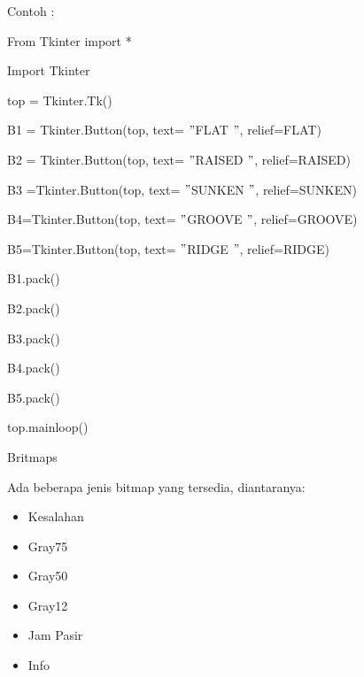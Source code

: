 \documentclass [12pt,a4paper,notitlepage,oneside,bahasa]{article}
\begin{document}
\begin{enumerate}
\begin{itemize}
\vspace{12pt}
Contoh : \par
{\fontsize{10pt}{10pt}\selectfont From Tkinter import *} \par
{\fontsize{10pt}{10pt}\selectfont Import Tkinter} \par
\vspace{10pt}
{\fontsize{10pt}{10pt}\selectfont top = Tkinter.Tk()} \par
{\fontsize{10pt}{10pt}\selectfont B1 = Tkinter.Button(top, text= $ " $FLAT $ " $, relief=FLAT)} \par
{\fontsize{10pt}{10pt}\selectfont B2 = Tkinter.Button(top, text= $ " $RAISED $ " $, relief=RAISED)} \par
{\fontsize{10pt}{10pt}\selectfont B3 =Tkinter.Button(top, text= $ " $SUNKEN $ " $, relief=SUNKEN)} \par
{\fontsize{10pt}{10pt}\selectfont B4=Tkinter.Button(top, text= $ " $GROOVE $ " $, relief=GROOVE)} \par
{\fontsize{10pt}{10pt}\selectfont B5=Tkinter.Button(top, text= $ " $RIDGE $ " $, relief=RIDGE)} \par
\vspace{10pt}
{\fontsize{10pt}{10pt}\selectfont B1.pack()} \par
{\fontsize{10pt}{10pt}\selectfont B2.pack()} \par
{\fontsize{10pt}{10pt}\selectfont B3.pack()} \par
{\fontsize{10pt}{10pt}\selectfont B4.pack()} \par
{\fontsize{10pt}{10pt}\selectfont B5.pack()} \par
{\fontsize{10pt}{10pt}\selectfont top.mainloop()} \par
\noindent 
Britmaps \par
\noindent 
Ada beberapa jenis bitmap yang tersedia, diantaranya: \par
\noindent 
\begin{itemize}
\item Kesalahan \par
\noindent 
\item Gray75 \par
\noindent 
\item Gray50 \par
\noindent 
\item Gray12 \par
\noindent 
\item Jam Pasir \par
\noindent 
\item Info \par

\end{itemize}
\end{itemize}
\end{enumerate}
\end{document}
